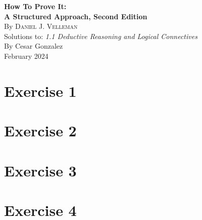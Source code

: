 \documentclass[letterpaper,12pt]{article}
\begin{document}
\pagestyle{fancy}
\setlength{\headheight}{15pt}
\begin{flushleft}

\begin{center}

    {\Large\textbf{How To Prove It:}\\[0.2em] %
    \Large\textbf{A Structured Approach, Second Edition}}\\[1.5em]

    {\normalsize By \textsc{Daniel J. Velleman}}\\[1.5em]

    Solutions to: \textit{1.1 Deductive Reasoning and Logical Connectives}\\[1.5em]

    By Cesar Gonzalez\\[0.5em]
    February 2024
\end{center}

\tableofcontents
\newpage

\section*{Exercise 1}


\section*{Exercise 2}


\section*{Exercise 3}


\section*{Exercise 4}



\end{flushleft}
\end{document}
